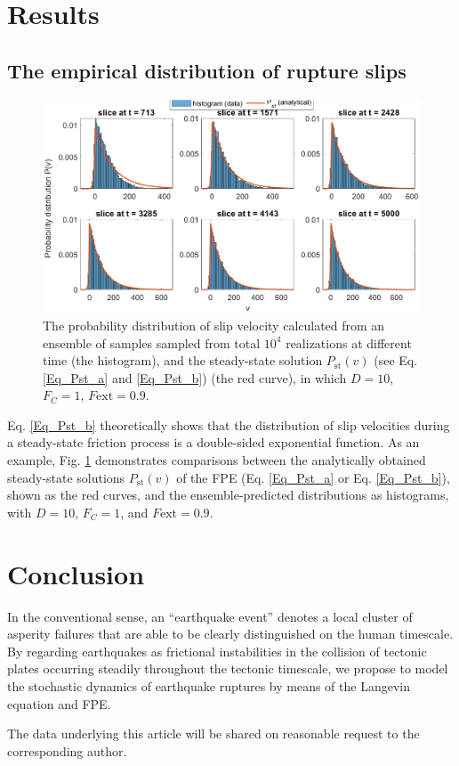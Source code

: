 \documentclass[extra]{gji} %
\begin{document}
\section{Results}
\subsection{The empirical distribution of rupture slips}

\begin{figure}
    \includegraphics[width=\textwidth]{PstSlices_D[10]_r[1]_Fc[0.9].eps}
    \caption{The probability distribution of slip velocity calculated from an ensemble of samples sampled from total $10^4$ realizations at different time (the histogram), and the steady-state solution $P_\text{st}(v)$ (see Eq.\ref{Eq_Pst_a} and \ref{Eq_Pst_b}) (the red curve), in which $D=10$, $F_C=1$, $F\text{ext}=0.9$.
    }
    \label{Fig_Pst_slices}
\end{figure}

Eq. \ref{Eq_Pst_b} theoretically shows that the distribution of slip velocities during a steady-state friction process is a double-sided exponential function.
As an example, Fig. \ref{Fig_Pst_slices} demonstrates comparisons between the analytically obtained steady-state solutions $P_\text{st}(v)$ of the FPE (Eq. \ref{Eq_Pst_a} or Eq. \ref{Eq_Pst_b}), shown as the red curves, and the ensemble-predicted distributions as histograms, with $D=10$, $F_C=1$, and $F\text{ext}=0.9$.


\section{Conclusion}
In the conventional sense, an ``earthquake event'' denotes a local cluster of asperity failures that are able to be clearly distinguished on the human timescale.
By regarding earthquakes as frictional instabilities in the collision of tectonic plates occurring steadily throughout the tectonic timescale, we propose to model the stochastic dynamics of earthquake ruptures by means of the Langevin equation and FPE.


\begin{acknowledgments}
    The data underlying this article will be shared on reasonable request to the corresponding author.
\end{acknowledgments}




\label{lastpage}
\end{document}
